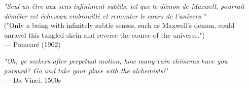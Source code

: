\begin{flushright}
\emph{"Seul un être aux sens infiniment subtils, tel que le démon de Maxwell, pourrait démêler cet écheveau embrouillé et remonter le cours de l’univers."} \\  
("Only a being with infinitely subtle senses, such as Maxwell’s demon, could unravel this tangled skein and reverse the course of the universe.") \\
 — Poincaré (1902)
\end{flushright}
\vspace{2em}
\begin{flushright}
    \emph{"Oh, ye seekers after perpetual motion, how many vain chimeras have you pursued? Go and take your place with the alchemists!"} \\
    — Da Vinci, 1500s
\end{flushright}
